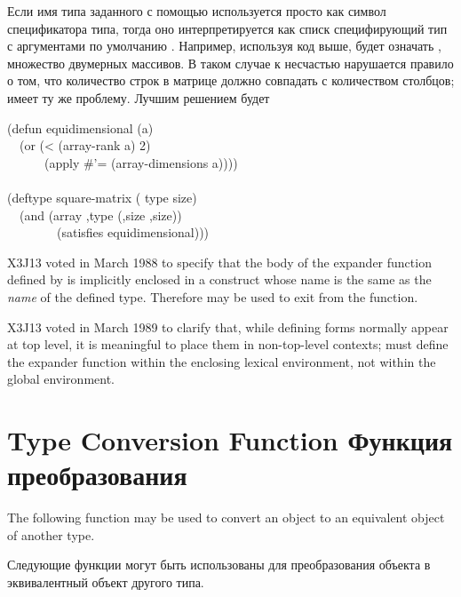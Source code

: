 \begin{defmac}
Если имя типа заданного с помощью  используется просто как символ
спецификатора типа, тогда оно интерпретируется как списк специфирующий тип с
аргументами по умолчанию \cdf{*}. Например, используя код выше,
 будет означать , множество двумерных
массивов.
В таком случае к несчастью нарушается правило о том, что количество строк в
матрице должно совпадать с количеством столбцов;  имеет
ту же проблему.
Лучшим решением будет
\begin{lisp}
(defun equidimensional (a) \\
~~(or (< (array-rank a) 2) \\
~~~~~~(apply \#'= (array-dimensions a)))) \\
 \\
(deftype square-matrix ( type size) \\
~~{\Xbq}(and (array ,type (,size ,size)) \\
~~~~~~~~(satisfies equidimensional)))
\end{lisp}

\begin{newer}
X3J13 voted in March 1988 
to specify that the body of the expander function defined
by  is implicitly enclosed in a  construct
whose name is the same as the \textit{name} of the defined type.
Therefore  may be used to exit from the function.
\end{newer}

\begin{newer}
X3J13 voted in March 1989 
to clarify that, while defining forms normally appear at top level,
it is meaningful to place them in non-top-level contexts;
 must define the expander function
within the enclosing lexical environment, not within the global
environment.
\end{newer}

\end{defmac}

\section{Type Conversion Function Функция преобразования}

The following function may be used to convert an object to an
equivalent object of another type.

Следующие функции могут быть использованы для преобразования объекта в
эквивалентный объект другого типа.

